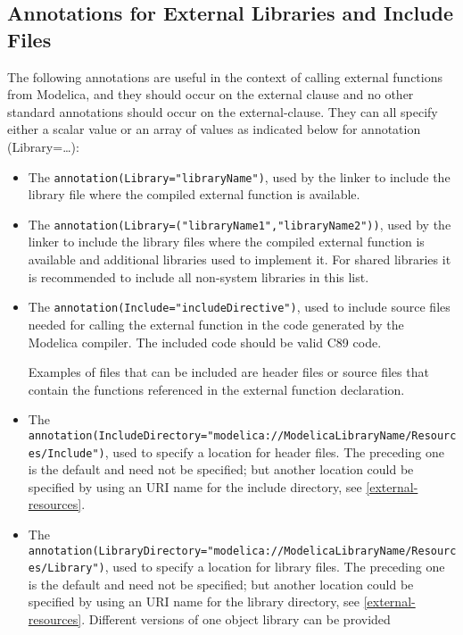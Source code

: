 \subsection{Annotations for External Libraries and Include Files}

The following annotations are useful in the context of calling external
functions from Modelica, and they should occur on the external clause
and no other standard annotations should occur on the external-clause.
They can all specify either a scalar value or an array of values as
indicated below for annotation (Library=\ldots{}):
\begin{itemize}
\item
  The \lstinline!annotation(Library="libraryName")!, used by the linker to include
  the library file where the compiled external function is available.
\item
  The \lstinline!annotation(Library=("libraryName1","libraryName2"))!, used by the
  linker to include the library files where the compiled external
  function is available and additional libraries used to implement it.
  For shared libraries it is recommended to include all non-system
  libraries in this list.
\item
  The \lstinline!annotation(Include="includeDirective")!, used to include source files needed for calling the external function in the code
  generated by the Modelica compiler. The included code should be valid C89 code.
  \begin{nonnormative}
  Examples of files that can be included are header files or source files that contain the
  functions referenced in the external function declaration.
  \end{nonnormative}
\item
  The
  \lstinline!annotation(IncludeDirectory="modelica://ModelicaLibraryName/Resources/Include")!,
  used to specify a location for header files. The preceding one is the
  default and need not be specified; but another location could be
  specified by using an URI name for the include directory, see \autoref{external-resources}.
\item
  The
  \lstinline!annotation(LibraryDirectory="modelica://ModelicaLibraryName/Resources/Library")!,
  used to specify a location for library files. The preceding one is the
  default and need not be specified; but another location could be
  specified by using an URI name for the library directory, see \autoref{external-resources}.
  Different versions of one object library can be provided

\end{itemize}
